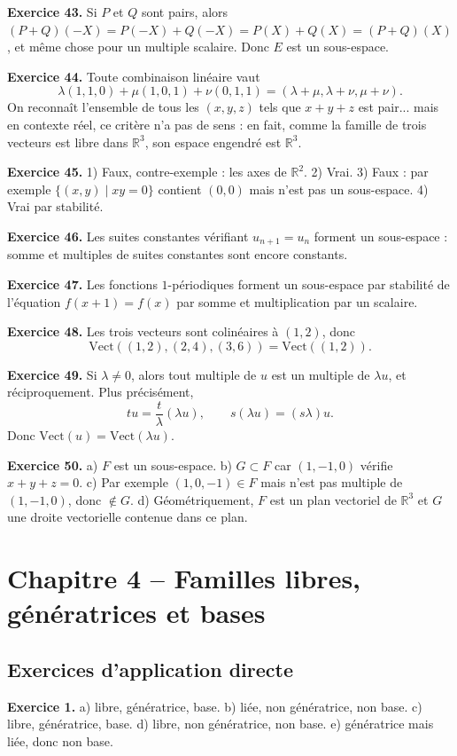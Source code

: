 \documentclass[11pt,a4paper]{article}
\newcommand{\R}{\mathbb R}
\newcommand{\Vect}{\mathrm{Vect}}
\begin{document}
\textbf{Exercice 43.} Si $P$ et $Q$ sont pairs, alors $(P+Q)(-X)=P(-X)+Q(-X)=P(X)+Q(X)=(P+Q)(X)$, et même chose pour un multiple scalaire. Donc $E$ est un sous-espace.

\textbf{Exercice 44.} Toute combinaison linéaire vaut
\[\lambda(1,1,0)+\mu(1,0,1)+\nu(0,1,1)=(\lambda+\mu,\lambda+\nu,\mu+\nu).\]
On reconnaît l'ensemble de tous les $(x,y,z)$ tels que $x+y+z$ est pair... mais en contexte réel, ce critère n'a pas de sens : en fait, comme la famille de trois vecteurs est libre dans $\R^3$, son espace engendré est $\R^3$.

\textbf{Exercice 45.} 1) Faux, contre-exemple : les axes de $\R^2$. 2) Vrai. 3) Faux : par exemple $\{(x,y)\mid xy=0\}$ contient $(0,0)$ mais n'est pas un sous-espace. 4) Vrai par stabilité.

\textbf{Exercice 46.} Les suites constantes vérifiant $u_{n+1}=u_n$ forment un sous-espace : somme et multiples de suites constantes sont encore constants.

\textbf{Exercice 47.} Les fonctions $1$-périodiques forment un sous-espace par stabilité de l'équation $f(x+1)=f(x)$ par somme et multiplication par un scalaire.

\textbf{Exercice 48.} Les trois vecteurs sont colinéaires à $(1,2)$, donc
\[\Vect((1,2),(2,4),(3,6))=\Vect((1,2)).\]

\textbf{Exercice 49.} Si $\lambda\neq 0$, alors tout multiple de $u$ est un multiple de $\lambda u$, et réciproquement. Plus précisément,
\[tu=\frac{t}{\lambda}(\lambda u),\qquad s(\lambda u)=(s\lambda)u.\]
Donc $\Vect(u)=\Vect(\lambda u)$.

\textbf{Exercice 50.} a) $F$ est un sous-espace. b) $G\subset F$ car $(1,-1,0)$ vérifie $x+y+z=0$. c) Par exemple $(1,0,-1)\in F$ mais n'est pas multiple de $(1,-1,0)$, donc $\notin G$. d) Géométriquement, $F$ est un plan vectoriel de $\R^3$ et $G$ une droite vectorielle contenue dans ce plan.

\newpage
\section{Chapitre 4 -- Familles libres, génératrices et bases}
\subsection*{Exercices d'application directe}
\textbf{Exercice 1.} a) libre, génératrice, base. b) liée, non génératrice, non base. c) libre, génératrice, base. d) libre, non génératrice, non base. e) génératrice mais liée, donc non base.
\end{document}
